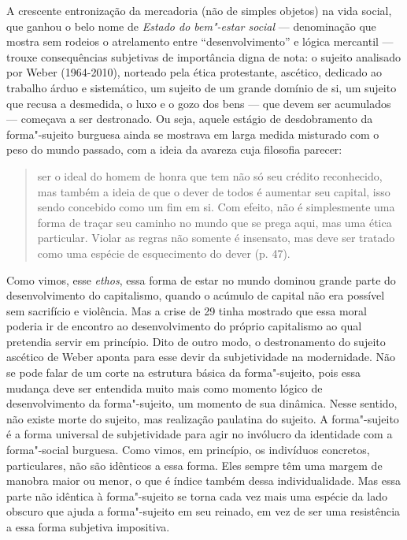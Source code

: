A crescente entronização da mercadoria (não de simples objetos) na vida
social, que ganhou o belo nome de \emph{Estado do bem"-estar social} ---
denominação que mostra sem rodeios o atrelamento entre
``desenvolvimento'' e lógica mercantil --- trouxe consequências
subjetivas de importância digna de nota: o sujeito analisado por Weber
(1964-2010), norteado pela ética protestante, ascético, dedicado ao
trabalho árduo e sistemático, um sujeito de um grande domínio de si, um
sujeito que recusa a desmedida, o luxo e o gozo dos bens --- que devem
ser acumulados --- começava a ser destronado. Ou seja, aquele estágio de
desdobramento da forma"-sujeito burguesa ainda se mostrava em larga
medida misturado com o peso do mundo passado, com a ideia da avareza
cuja filosofia parecer:

\begin{quote}
ser o ideal do homem de honra que tem não só seu crédito reconhecido,
mas também a ideia de que o dever de todos é aumentar seu capital, isso
sendo concebido como um fim em si. Com efeito, não é simplesmente uma
forma de traçar seu caminho no mundo que se prega aqui, mas uma ética
particular. Violar as regras não somente é insensato, mas deve ser
tratado como uma espécie de esquecimento do dever (p. 47).
\end{quote}

Como vimos, esse \emph{ethos}, essa forma de estar no mundo dominou
grande parte do desenvolvimento do capitalismo, quando o acúmulo de
capital não era possível sem sacrifício e violência. Mas a crise de 29
tinha mostrado que essa moral poderia ir de encontro ao desenvolvimento
do próprio capitalismo ao qual pretendia servir em princípio. Dito de
outro modo, o destronamento do sujeito ascético de Weber aponta para
esse devir da subjetividade na modernidade. Não se pode falar de um
corte na estrutura básica da forma"-sujeito, pois essa mudança deve ser
entendida muito mais como momento lógico de desenvolvimento da
forma"-sujeito, um momento de sua dinâmica. Nesse sentido, não existe
morte do sujeito, mas realização paulatina do sujeito. A forma"-sujeito é
a forma universal de subjetividade para agir no invólucro da identidade
com a forma"-social burguesa. Como vimos, em princípio, os indivíduos
concretos, particulares, não são idênticos a essa forma. Eles sempre têm
uma margem de manobra maior ou menor, o que é índice também dessa
individualidade. Mas essa parte não idêntica à forma"-sujeito se torna
cada vez mais uma espécie da lado obscuro que ajuda a forma"-sujeito em
seu reinado, em vez de ser uma resistência a essa forma subjetiva
impositiva.


